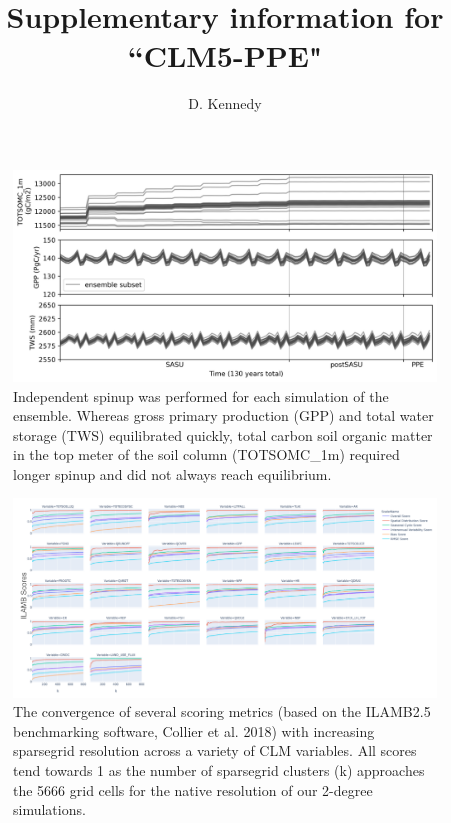 \documentclass[11pt]{article}
\title{Supplementary information for ``CLM5-PPE"}
\author{D. Kennedy}
\begin{document}
\maketitle


\begin{figure}[h]
\centering
\includegraphics[width=40pc]{../figs/supp/spinup.png}
\caption{Independent spinup was performed for each simulation of the ensemble. Whereas gross primary production (GPP) and total water storage (TWS) equilibrated quickly, total carbon soil organic matter in the top meter of the soil column (TOTSOMC\_1m) required longer spinup and did not always reach equilibrium.}
\label{supp:spinup}
\end{figure}


\begin{landscape}
\begin{figure}[h]
\centering
\includegraphics[width=60pc]{../figs/supp/ilamb_lines.png}
\caption{The convergence of several scoring metrics (based on the ILAMB2.5 benchmarking software, Collier et al. 2018) with increasing sparsegrid resolution across a variety of CLM variables. All scores tend towards 1 as the number of sparsegrid clusters (k) approaches the 5666 grid cells for the native resolution of our 2-degree simulations. }
\label{supp:ilamb}
\end{figure}
\end{landscape}
\end{document}
